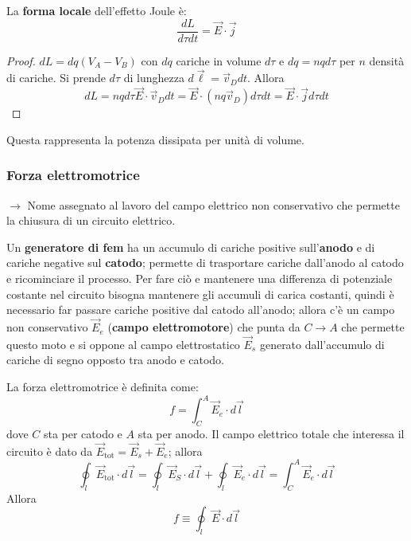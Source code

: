 \documentclass[a4paper]{scrartcl}
\numberwithin{equation}{subsection}
\theoremstyle{style1}
\newenvironment{boxenv}[1][]{
    \begin{eqbox}[#1]
    }{
   \end{eqbox}
}
\begin{document}
La \textbf{forma locale} dell'effetto Joule \`e:
\begin{equation}
	\frac{dL}{d\tau dt} = \vec{E}\cdot \vec{j}
\end{equation}
\begin{boxenv}[]
\begin{proof}
	$dL = dq (V_A -V_B)$ con $dq$ cariche in volume $d\tau $ e $dq = nq d\tau $ per $n$ densit\`a di cariche. Si prende $d\tau $ di lunghezza $d\vec{\ell }=\vec{v}_D dt$. Allora
	\begin{equation}
		dL = nqd\tau  \vec{E}\cdot \vec{v}_D dt = \vec{E}\cdot (nq\vec{v}_D) d\tau dt = \vec{E}\cdot \vec{j}d\tau dt
	\end{equation}
\end{proof}
\end{boxenv}
\noindent Questa rappresenta la potenza dissipata per unit\`a di volume.
\subsubsection{Forza elettromotrice}

$\to$ Nome assegnato al lavoro del campo elettrico non conservativo che permette la chiusura di un circuito elettrico.

Un \textbf{generatore di fem} ha un accumulo di cariche positive sull'\textbf{anodo} e di cariche negative sul \textbf{catodo}; permette di trasportare cariche dall'anodo al catodo e ricominciare il processo. Per fare ci\`o e mantenere una differenza di potenziale costante nel circuito bisogna mantenere gli accumuli di carica costanti, quindi \`e necessario far passare cariche positive dal catodo all'anodo; allora c'\`e un campo non conservativo $\vec{E}_e$ (\textbf{campo elettromotore}) che punta da $ C\to A$ che permette questo moto e si oppone al campo elettrostatico $\vec{E}_s$ generato dall'accumulo di cariche di segno opposto tra anodo e catodo.

La forza elettromotrice \`e definita come:
\begin{equation}
	f = \int_{C} ^A \vec{E}_e \cdot d\vec{l}
\end{equation}
dove $C$ sta per catodo e $A$ sta per anodo. Il campo elettrico totale che interessa il circuito \`e dato da $\vec{E}_\text{tot} = \vec{E}_s + \vec{E}_e$; allora
\begin{equation}
	\oint_{l} \vec{E}_\text{tot}\cdot d\vec{l} = \oint_{l} \vec{E}_S \cdot d\vec{l} + \oint_{l} \vec{E}_e \cdot d\vec{l} = \int_{C} ^A \vec{E}_e\cdot d\vec{l} 
\end{equation}
Allora
\begin{equation}
	f\equiv\oint_{l} \vec{E}\cdot d\vec{l}
\end{equation}
\end{document}
